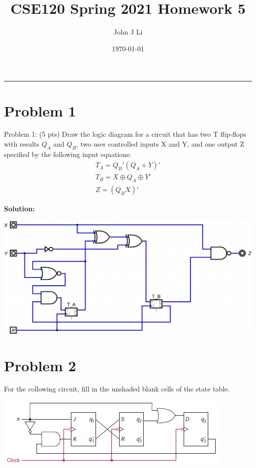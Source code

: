 \documentclass{article}
\title{CSE120 Spring 2021 Homework 5}
\date{\today}
\author{John J Li}
\begin{document}
    \maketitle
    \thispagestyle{empty}
    \noindent\rule{\textwidth}{0.8pt}


    \section*{Problem 1}

    Problem 1: (5 pts) Draw the logic diagram for a circuit that has two T flip-flops with 
    results $Q_A$ and $Q_B$, two user controlled inputs X and Y, and one output Z specified by 
    the following input equations:
    \begin{align*}
        T_A=Q_B'(Q_A+Y)' \\
        T_B=X\oplus Q_A\oplus Y' \\
        Z=(Q_BX)'
    \end{align*}

    \textbf{Solution:}
    \begin{center}
        \includegraphics[width=\linewidth]{HW5_01_s01.jpg}
    \end{center}


    \section*{Problem 2}

    For the collowing circuit, fill in the unshaded blank cells of the state table.

    \begin{center}
        \includegraphics[scale=1]{hw5_02_circuit.jpg}
    \end{center}
\end{document}
